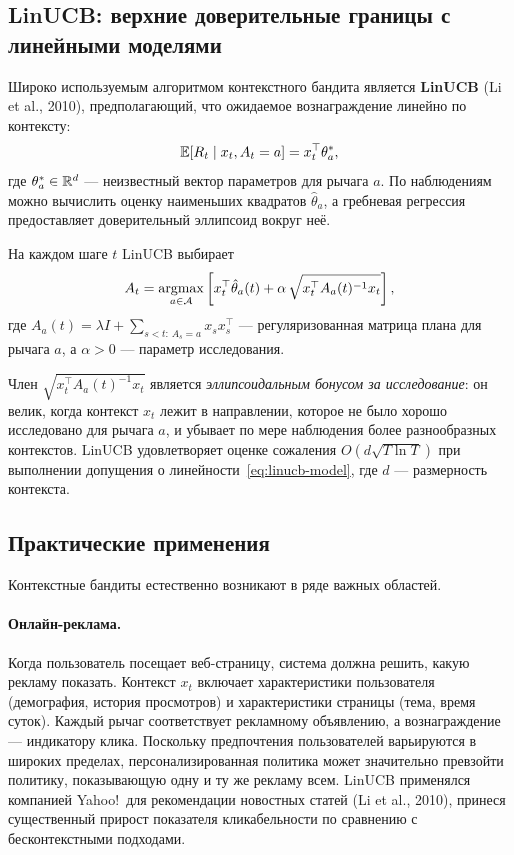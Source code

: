 \subsection*{LinUCB: верхние доверительные границы с линейными моделями}

Широко используемым алгоритмом контекстного бандита является \textbf{LinUCB} (Li et al., 2010), предполагающий, что ожидаемое вознаграждение линейно по контексту:
\begin{equation}
\label{eq:linucb-model}
\operatorname{\mathbb{E}}[R_t \mid x_t, A_t=a] = x_t^\top \theta_a^*,
\end{equation}
где $\theta_a^*\in\mathbb{R}^d$ — неизвестный вектор параметров для рычага $a$.  По наблюдениям можно вычислить оценку наименьших квадратов $\hat\theta_a$, а гребневая регрессия предоставляет доверительный эллипсоид вокруг неё.

\begin{definition}
\label{def:linucb}
На каждом шаге $t$ LinUCB выбирает
\begin{equation}
\label{eq:linucb}
A_t = \operatorname*{argmax}_{a\in\mathcal{A}}\left[x_t^\top\hat\theta_a(t) + \alpha\,\sqrt{x_t^\top A_a(t)^{-1}x_t}\right],
\end{equation}
где $A_a(t) = \lambda I + \sum_{s<t:\,A_s=a}x_s x_s^\top$ — регуляризованная матрица плана для рычага $a$, а $\alpha>0$ — параметр исследования.
\end{definition}

Член $\sqrt{x_t^\top A_a(t)^{-1}x_t}$ является \emph{эллипсоидальным бонусом за исследование}: он велик, когда контекст $x_t$ лежит в направлении, которое не было хорошо исследовано для рычага $a$, и убывает по мере наблюдения более разнообразных контекстов.  LinUCB удовлетворяет оценке сожаления $O(d\sqrt{T\ln T})$ при выполнении допущения о линейности~\eqref{eq:linucb-model}, где $d$ — размерность контекста.

\subsection*{Практические применения}

Контекстные бандиты естественно возникают в ряде важных областей.

\paragraph{Онлайн-реклама.}
Когда пользователь посещает веб-страницу, система должна решить, какую рекламу показать.  Контекст $x_t$ включает характеристики пользователя (демография, история просмотров) и характеристики страницы (тема, время суток).  Каждый рычаг соответствует рекламному объявлению, а вознаграждение — индикатору клика.  Поскольку предпочтения пользователей варьируются в широких пределах, персонализированная политика может значительно превзойти политику, показывающую одну и ту же рекламу всем.  LinUCB применялся компанией Yahoo!\  для рекомендации новостных статей (Li et al., 2010), принеся существенный прирост показателя кликабельности по сравнению с бесконтекстными подходами.

